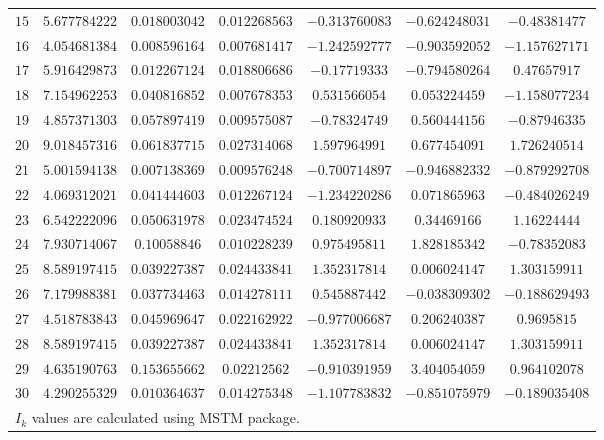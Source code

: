 \documentclass[preprint,  3p]{elsarticle}
\begin{document}
\begin{table}[h]
\begin{center}
\begin{tabular}{|c|c|c|c|c|c|c|}
			$15$ & $5.677784222$ & $0.018003042$ & $0.012268563$ & $-0.313760083$ & $-0.624248031$ & $-0.48381477$ \\
			$16$ & $4.054681384$ & $0.008596164$ & $0.007681417$ & $-1.242592777$ & $-0.903592052$ & $-1.157627171$ \\
			$17$ & $5.916429873$ & $0.012267124$ & $0.018806686$ & $-0.17719333$ & $-0.794580264$ & $0.47657917$ \\
			$18$ & $7.154962253$ & $0.040816852$ & $0.007678353$ & $0.531566054$ & $0.053224459$ & $-1.158077234$ \\
			$19$ & $4.857371303$ & $0.057897419$ & $0.009575087$ & $-0.78324749$ & $0.560444156$ & $-0.87946335$ \\
			$20$ & $9.018457316$ & $0.061837715$ & $0.027314068$ & $1.597964991$ & $0.677454091$ & $1.726240514$ \\
			$21$ & $5.001594138$ & $0.007138369$ & $0.009576248$ & $-0.700714897$ & $-0.946882332$ & $-0.879292708$ \\
			$22$ & $4.069312021$ & $0.041444603$ & $0.012267124$ & $-1.234220286$ & $0.071865963$ & $-0.484026249$ \\
			$23$ & $6.542222096$ & $0.050631978$ & $0.023474524$ & $0.180920933$ & $0.34469166$ & $1.16224444$ \\
			$24$ & $7.930714067$ & $0.10058846$ & $0.010228239$ & $0.975495811$ & $1.828185342$ & $-0.78352083$ \\
			$25$ & $8.589197415$ & $0.039227387$ & $0.024433841$ & $1.352317814$ & $0.006024147$ & $1.303159911$ \\
			$26$ & $7.179988381$ & $0.037734463$ & $0.014278111$ & $0.545887442$ & $-0.038309302$ & $-0.188629493$ \\
			$27$ & $4.518783843$ & $0.045969647$ & $0.022162922$ & $-0.977006687$ & $0.206240387$ & $0.9695815$ \\
			$28$ & $8.589197415$ & $0.039227387$ & $0.024433841$ & $1.352317814$ & $0.006024147$ & $1.303159911$ \\
			$29$ & $4.635190763$ & $0.153655662$ & $0.02212562$ & $-0.910391959$ & $3.404054059$ & $0.964102078$ \\
			$30$ & $4.290255329$ & $0.010364637$ & $0.014275348$ & $-1.107783832$ & $-0.851075979$ & $-0.189035408$ \\
			\hline\hline 
			\multicolumn{7}{l}{\small *$I_k$ values are calculated using MSTM package.} \\
		\end{tabular}
	\end{center}
\end{table}

\end{document}
